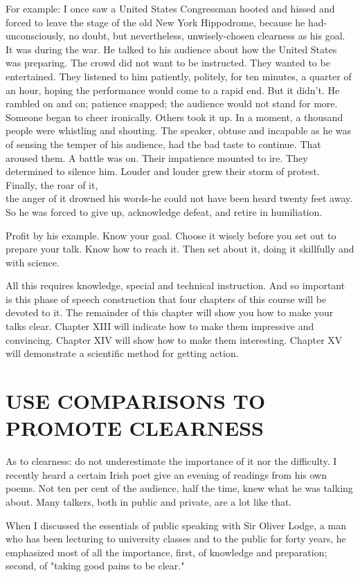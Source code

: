 \documentclass[10pt]{article}
\begin{document}
For example: I once saw a United States Congressman hooted and hissed and forced to leave the stage of the old New York Hippodrome, because he had-unconsciously, no doubt, but nevertheless, unwisely-chosen clearness as his goal. It was during the war. He talked to his audience about how the United States was preparing. The crowd did not want to be instructed. They wanted to be entertained. They listened to him patiently, politely, for ten minutes, a quarter of an hour, hoping the performance would come to a rapid end. But it didn't. He rambled on and on; patience snapped; the audience would not stand for more. Someone began to cheer ironically. Others took it up. In a moment, a thousand people were whistling and shouting. The speaker, obtuse and incapable as he was of sensing the temper of his audience, had the bad taste to continue. That aroused them. A battle was on. Their impatience mounted to ire. They determined to silence him. Louder and louder grew their storm of protest. Finally, the roar of it,\\
the anger of it drowned his words-he could not have been heard twenty feet away. So he was forced to give up, acknowledge defeat, and retire in humiliation.

Profit by his example. Know your goal. Choose it wisely before you set out to prepare your talk. Know how to reach it. Then set about it, doing it skillfully and with science.

All this requires knowledge, special and technical instruction. And so important is this phase of speech construction that four chapters of this course will be devoted to it. The remainder of this chapter will show you how to make your talks clear. Chapter XIII will indicate how to make them impressive and convincing. Chapter XIV will show how to make them interesting. Chapter XV will demonstrate a scientific method for getting action.

\section*{USE COMPARISONS TO PROMOTE CLEARNESS}
As to clearness: do not underestimate the importance of it nor the difficulty. I recently heard a certain Irish poet give an evening of readings from his own poems. Not ten per cent of the audience, half the time, knew what he was talking about. Many talkers, both in public and private, are a lot like that.

When I discussed the essentials of public speaking with Sir Oliver Lodge, a man who has been lecturing to university classes and to the public for forty years, he emphasized most of all the importance, first, of knowledge and preparation; second, of "taking good pains to be clear."
\end{document}
